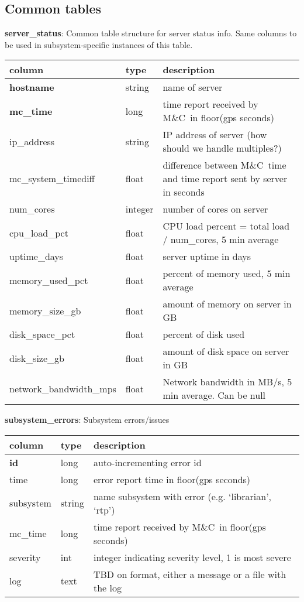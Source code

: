 \documentclass{article}
\newcommand{\mc}{M\&C}
\begin{document}
\subsection{Common tables}
\textbf{\large{server\_status}}: Common table structure for server status info. Same columns to be used in subsystem-specific instances of this table.
\begin{center}
 \begin{tabular}{| p{4cm} | p{2cm} | p{10cm} |} 
\hline
 column & type & description \\ [0.5ex]  \hline\hline
 \textbf{hostname} & string &  name of server \\ \hline
 \textbf{mc\_time} & long & time report received by \mc\ in floor(gps seconds) \\ \hline
 ip\_address & string & IP address of server (how should we handle multiples?) \\\hline
mc\_system\_timediff & float & difference between \mc\ time and time report sent by server in seconds \\\hline
num\_cores & integer & number of cores on server \\\hline
cpu\_load\_pct & float & CPU load percent = total load / num\_cores, 5 min average  \\\hline
uptime\_days & float & server uptime in days  \\\hline
memory\_used\_pct & float & percent of memory used, 5 min average  \\\hline
memory\_size\_gb & float & amount of memory on server in GB \\\hline
disk\_space\_pct & float & percent of disk used  \\\hline
disk\_size\_gb & float & amount of disk space on server in GB \\\hline
network\_bandwidth\_mps & float & Network bandwidth in MB/s, 5 min average. Can be null \\\hline
\end{tabular}
\end{center}

\textbf{\large{subsystem\_errors}}: Subsystem errors/issues
\begin{center}
 \begin{tabular}{| p{4cm} | p{2cm} | p{10cm} |} 
\hline
 column & type & description \\ [0.5ex]  \hline\hline
\textbf{id} & long & auto-incrementing error id\\ \hline
time & long & error report time in floor(gps seconds)\\ \hline
subsystem & string & name subsystem with error (e.g. `librarian', `rtp')\\ \hline
mc\_time & long & time report received by \mc\ in floor(gps seconds) \\ \hline
severity & int & integer indicating severity level, 1 is most severe \\ \hline
log & text & TBD on format, either a message or a file with the log \\ \hline
\end{tabular}
\end{center}
\end{document}
